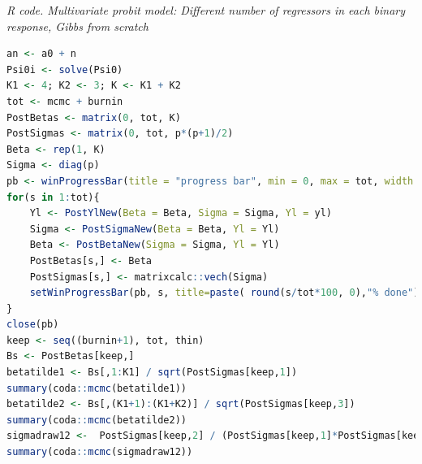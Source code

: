 \begin{enumerate}[leftmargin=*]
\begin{tcolorbox}[enhanced,width=4.67in,center upper,
	fontupper=\large\bfseries,drop shadow southwest,sharp corners]
	\textit{R code. Multivariate probit model: Different number of regressors in each binary response, Gibbs from scratch}
	\begin{VF}
		\begin{lstlisting}[language=R]
an <- a0 + n
Psi0i <- solve(Psi0)
K1 <- 4; K2 <- 3; K <- K1 + K2
tot <- mcmc + burnin
PostBetas <- matrix(0, tot, K)
PostSigmas <- matrix(0, tot, p*(p+1)/2)
Beta <- rep(1, K)
Sigma <- diag(p)
pb <- winProgressBar(title = "progress bar", min = 0, max = tot, width = 300)
for(s in 1:tot){
	Yl <- PostYlNew(Beta = Beta, Sigma = Sigma, Yl = yl)
	Sigma <- PostSigmaNew(Beta = Beta, Yl = Yl)
	Beta <- PostBetaNew(Sigma = Sigma, Yl = Yl)
	PostBetas[s,] <- Beta
	PostSigmas[s,] <- matrixcalc::vech(Sigma)
	setWinProgressBar(pb, s, title=paste( round(s/tot*100, 0),"% done"))
}
close(pb)
keep <- seq((burnin+1), tot, thin)
Bs <- PostBetas[keep,]
betatilde1 <- Bs[,1:K1] / sqrt(PostSigmas[keep,1])
summary(coda::mcmc(betatilde1))
betatilde2 <- Bs[,(K1+1):(K1+K2)] / sqrt(PostSigmas[keep,3])
summary(coda::mcmc(betatilde2))
sigmadraw12 <-  PostSigmas[keep,2] / (PostSigmas[keep,1]*PostSigmas[keep,3])^0.5
summary(coda::mcmc(sigmadraw12))
\end{lstlisting}
	\end{VF}
\end{tcolorbox}

\end{enumerate}